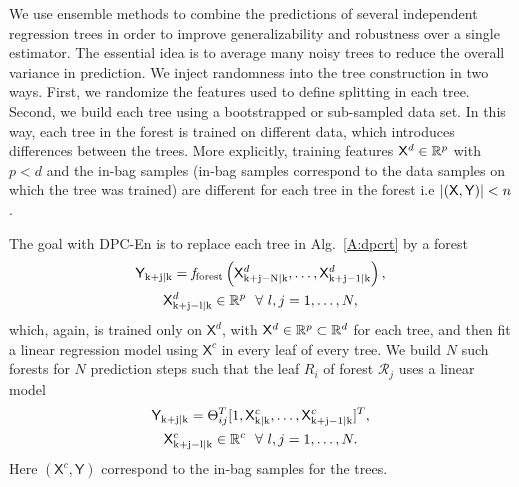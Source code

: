 We use ensemble methods \cite{Friedman2001} to combine the predictions of several independent regression trees in order to improve generalizability and robustness over a single estimator. 
The essential idea is to average many noisy trees to reduce the overall variance in prediction.
We inject randomness into the tree construction in two ways. First, we randomize the features used to define splitting in each tree.
Second, we build each tree using a bootstrapped or sub-sampled data set.
In this way, each tree in the forest is trained on different data, which introduces differences between the trees. More explicitly, training features $\mathsf{X}^d \in \mathbb{R}^p$ with $p<d$ and the in-bag samples (in-bag samples correspond to the data samples on which the tree was trained) are different for each tree in the forest i.e $|(\mathsf{X},\mathsf{Y})|<n$.

The goal with DPC-En is to replace each tree in Alg.~\ref{A:dpcrt} by a forest
\begin{gather}
\label{E:model_forest}
\mathsf{Y}_{\mathrm{k+j|k}} = \mathit{f}_{\mathrm{forest}} \left( \mathsf{X}^d_{\mathrm{k+j-N|k}} ,\dots,\mathsf{X}^d_{\mathrm{k+j-1|k}}  \right), \\ \nonumber
\mathsf{X}^d_{\mathrm{k+j-l|k}} \in \mathbb{R}^p \  \ \forall \ l,j=1,\dots,N,
\end{gather}
which, again, is trained only on $\mathsf{X}^d$, with $\mathsf{X}^d \in \mathbb{R}^p \subset \mathbb{R}^d$ for each tree,  and then fit a linear regression model using $\mathsf{X}^c$ in every leaf of every tree. We build $N$ such forests for $N$ prediction steps such that the leaf $R_i$ of forest $\mathcal{R}_j$ uses a linear model
\begin{gather}
\label{E:model_leaf_forest}
\mathsf{Y}_{\mathrm{k+j|k}} =  \Theta^T_{ij} [1,\mathsf{X}^c_{\mathrm{k|k}},\dots,\mathsf{X}^c_{\mathrm{k+j-1|k}} ]^T, \\ \nonumber
\mathsf{X}^c_{\mathrm{k+j-l|k}} \in \mathbb{R}^c \  \ \forall \ l,j=1,\dots,N.
\end{gather}
Here $(\mathsf{X}^c,\mathsf{Y})$ correspond to the in-bag samples for the trees.

